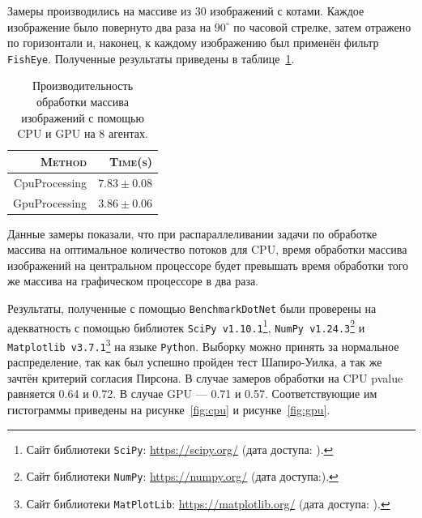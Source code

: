 Замеры производились на массиве из 30 изображений с котами. Каждое изображение было повернуто два раза на $90^{\circ}$ по часовой стрелке, затем отражено по горизонтали и, наконец, к каждому изображению был применён фильтр \texttt{FishEye}. Полученные результаты приведены в таблице~\ref{processing}.

\begin{table}[h]
\centering
    \caption{Производительность обработки массива изображений с помощью CPU и GPU на 8 агентах.}
    \begin{tabular}{| r | r |}
    \hline
        \textsc{Method} & \textsc{Time(s)} \\ 
        \hline
        CpuProcessing & $7.83 \pm 0.08$ \\ 
        GpuProcessing & $3.86 \pm 0.06$ \\
    \hline    
    \end{tabular}%
    \label{processing}
\end{table}

Данные замеры показали, что при распараллеливании задачи по обработке массива на оптимальное количество потоков для CPU, время обработки массива изображений на центральном процессоре будет превышать время обработки того же массива на графическом процессоре в два раза.

Результаты, полученные с помощью \texttt{BenchmarkDotNet} были проверены на адекватность с помощью библиотек \texttt{SciPy v1.10.1}\footnote{Сайт библиотеки \texttt{SciPy}: \url{https://scipy.org/} (дата доступа:   ).}, \texttt{NumPy v1.24.3}\footnote{Сайт библиотеки \texttt{NumPy}: \url{https://numpy.org/} (дата доступа:).} и \texttt{Matplotlib v3.7.1}\footnote{Сайт библиотеки \texttt{MatPlotLib}: \url{https://matplotlib.org/} (дата доступа:   ).} на языке \texttt{Python}. Выборку можно принять за нормальное распределение, так как был успешно пройден тест Шапиро-Уилка, а так же зачтён критерий согласия Пирсона. В случае замеров обработки на CPU pvalue равняется 0.64 и 0.72. В случае GPU --- 0.71 и 0.57. Соответствующие им гистограммы приведены на рисунке~\ref{fig:cpu} и рисунке~\ref{fig:gpu}.

